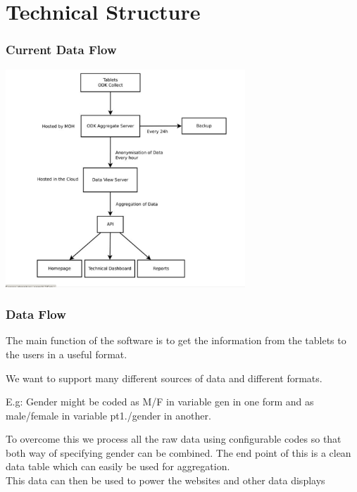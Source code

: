\documentclass{beamer}
\begin{document}
\section{Technical Structure}
\begin{frame}
  \frametitle{Current Data Flow}
  \begin{center}
    \includegraphics[width=9cm]{data_flow.png}
  \end{center}
\end{frame}

\begin{frame}
  \frametitle{Data Flow}
  The main function of the software is to get the information from the tablets to the users in a useful format. \\
  \vspace{10pt}

  We want to support many different sources of data and different formats. \\

    \vspace{10pt}
  
  E.g: Gender might be coded as M/F in variable gen in one form and as male/female in variable pt1./gender in another. \\

    \vspace{10pt}
  
    To overcome this we process all the raw data using configurable codes so that both way of specifying gender can be combined. The end point of this is a clean data table which can easily be used for aggregation. \\

    \vspace{10pt}
    This data can then be used to power the websites and other data displays

    
  \end{frame}
\end{document}

